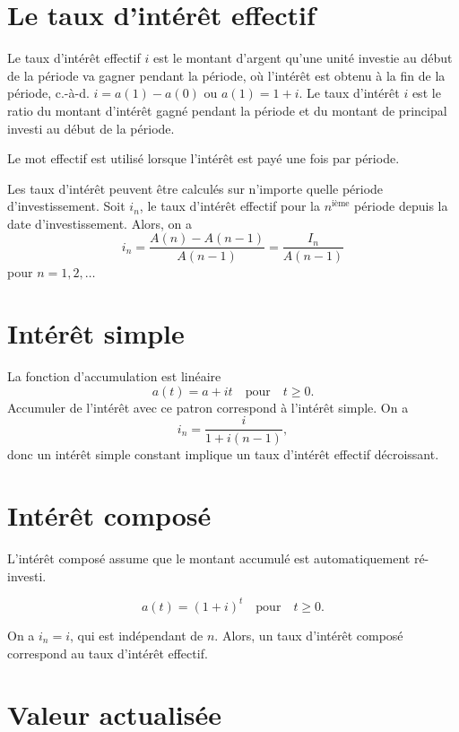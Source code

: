\section{Le taux d'intérêt effectif}

\begin{definition}{}{}
	Le taux d'intérêt effectif $i$ est le montant d'argent qu'une unité investie au début de la période va gagner pendant la période, où l'intérêt est obtenu à la fin de la période, c.-à-d. $i = a(1) - a(0)$ ou $a(1) = 1 + i$.
	\tcblower
	Le taux d'intérêt $i$ est le ratio du montant d'intérêt gagné pendant la période et du montant de principal investi au début de la période. 
\end{definition}

Le mot effectif est utilisé lorsque l'intérêt est payé une fois par période. 

Les taux d'intérêt peuvent être calculés sur n'importe quelle période d'investissement. Soit $i_n$, le taux d'intérêt effectif pour la $n^\text{ième}$ période depuis la date d'investissement. Alors, on a 
$$i_n = \frac{A(n) - A(n-1)}{A(n-1)} = \frac{I_n}{A(n-1)}$$
pour $n = 1, 2, \dots$

\section{Intérêt simple}

La fonction d'accumulation est linéaire
$$a(t) = a + it \quad \text{pour} \quad t\geq 0.$$ Accumuler de l'intérêt avec ce patron correspond à l'intérêt simple. On a 
$$i_n = \frac{i}{1 + i(n-1)},$$
donc un intérêt simple constant implique un taux d'intérêt effectif décroissant. 

\section{Intérêt composé}

L'intérêt composé assume que le montant accumulé est automatiquement ré-investi. 

$$a(t) = (1 + i)^t \quad \text{pour} \quad t\geq 0.$$

On a $i_n = i$, qui est indépendant de $n$. Alors, un taux d'intérêt composé correspond au taux d'intérêt effectif. 

\section{Valeur actualisée}

